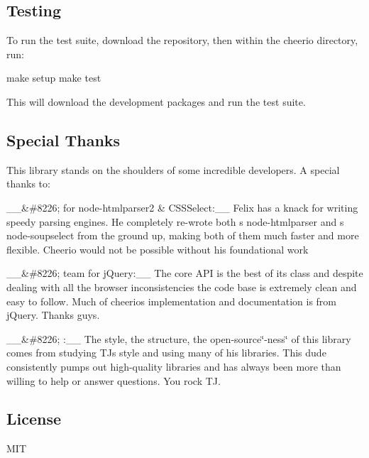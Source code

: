 \subsection*{Testing}

To run the test suite, download the repository, then within the cheerio directory, run\+:


\begin{DoxyCode}
make setup
make test
\end{DoxyCode}


This will download the development packages and run the test suite.

\subsection*{Special Thanks}

This library stands on the shoulders of some incredible developers. A special thanks to\+:

\+\_\+\+\_\+\&\#8226;  for node-\/htmlparser2 \& C\+S\+S\+Select\+:\+\_\+\+\_\+ Felix has a knack for writing speedy parsing engines. He completely re-\/wrote both \textquotesingle{}s {\ttfamily node-\/htmlparser} and \textquotesingle{}s {\ttfamily node-\/soupselect} from the ground up, making both of them much faster and more flexible. Cheerio would not be possible without his foundational work

\+\_\+\+\_\+\&\#8226;  team for j\+Query\+:\+\_\+\+\_\+ The core A\+PI is the best of its class and despite dealing with all the browser inconsistencies the code base is extremely clean and easy to follow. Much of cheerio\textquotesingle{}s implementation and documentation is from j\+Query. Thanks guys.

\+\_\+\+\_\+\&\#8226; \+:\+\_\+\+\_\+ The style, the structure, the open-\/source\char`\"{}-\/ness\char`\"{} of this library comes from studying TJ\textquotesingle{}s style and using many of his libraries. This dude consistently pumps out high-\/quality libraries and has always been more than willing to help or answer questions. You rock TJ.

\subsection*{License}

M\+IT 